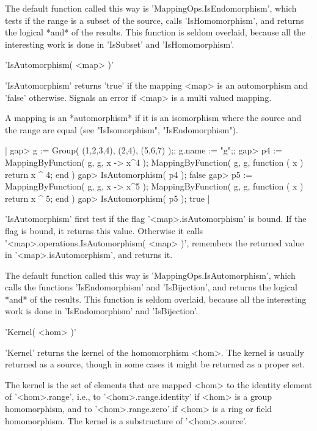 The  default  function called  this  way is  'MappingOps.IsEndomorphism',
which  tests   if   the   range  is  a   subset  of  the  source,   calls
'IsHomomorphism', and  returns the  logical *and* of  the results.   This
function is seldom overlaid,  because all the interesting work is done in
'IsSubset' and 'IsHomomorphism'.


'IsAutomorphism( <map> )'

'IsAutomorphism'  returns 'true' if the mapping  <map> is an automorphism
and 'false'  otherwise.  Signals  an  error  if <map> is  a multi  valued
mapping.

A  mapping is an *automorphism* if it is an isomorphism where  the source
and the range are equal (see "IsIsomorphism", "IsEndomorphism").

|    gap> g := Group( (1,2,3,4), (2,4), (5,6,7) );;  g.name := "g";;
    gap> p4 := MappingByFunction( g, g, x -> x^4 );
    MappingByFunction( g, g, function ( x )
        return x ^ 4;
    end )
    gap> IsAutomorphism( p4 );
    false
    gap> p5 := MappingByFunction( g, g, x -> x^5 );
    MappingByFunction( g, g, function ( x )
        return x ^ 5;
    end )
    gap> IsAutomorphism( p5 );
    true |

'IsAutomorphism' first test if  the flag '<map>.isAutomorphism' is bound.
If the  flag  is  bound,  it  returns  this  value.   Otherwise it  calls
'<map>.operations.IsAutomorphism( <map> )', remembers  the returned value
in '<map>.isAutomorphism', and returns it.

The  default function called  this  way  is  'MappingOps.IsAutomorphism',
which calls the functions 'IsEndomorphism' and 'IsBijection', and returns
the  logical *and*  of the  results.   This function  is seldom overlaid,
because  all  the  interesting  work  is  done  in  'IsEndomorphism'  and
'IsBijection'.


'Kernel( <hom> )'

'Kernel'  returns the kernel  of the  homomorphism <hom>.   The kernel is
usually returned as a source,  though in some cases it  might be returned
as a proper set.

The kernel is the set of elements that  are mapped  <hom> to the identity
element of '<hom>.range',  i.e., to '<hom>.range.identity' if  <hom> is a
group homomorphism, and to '<hom>.range.zero' if <hom> is a ring or field
homomorphism.  The kernel is a substructure of '<hom>.source'.

